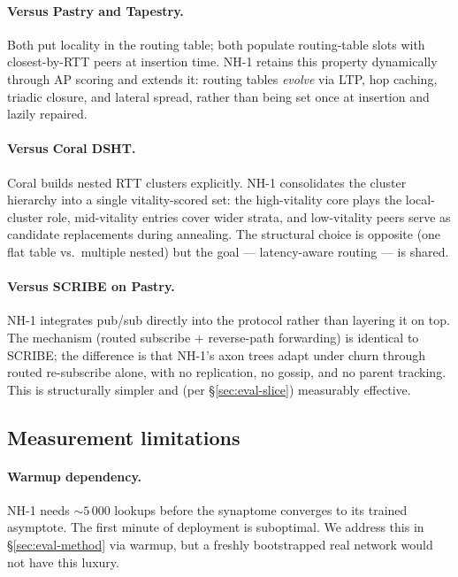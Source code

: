 \documentclass[conference]{IEEEtran}
\newcommand{\nhone}{NH-1\xspace}
\begin{document}
\paragraph{Versus Pastry and Tapestry.} Both put locality in the
routing table; both populate routing-table slots with closest-by-RTT
peers at insertion time. \nhone retains this property dynamically
through AP scoring and extends it: routing tables \emph{evolve} via
LTP, hop caching, triadic closure, and lateral spread, rather than
being set once at insertion and lazily repaired.

\paragraph{Versus Coral DSHT.} Coral builds nested RTT clusters
explicitly. \nhone consolidates the cluster hierarchy into a single
vitality-scored set: the high-vitality core plays the local-cluster
role, mid-vitality entries cover wider strata, and low-vitality peers
serve as candidate replacements during annealing. The structural
choice is opposite (one flat table vs.\ multiple nested) but the goal
--- latency-aware routing --- is shared.

\paragraph{Versus SCRIBE on Pastry.} \nhone integrates pub/sub directly
into the protocol rather than layering it on top. The mechanism
(routed subscribe + reverse-path forwarding) is identical to SCRIBE; the
difference is that \nhone's axon trees adapt under churn through routed
re-subscribe alone, with no replication, no gossip, and no parent
tracking. This is structurally simpler and (per
\S\ref{sec:eval-slice}) measurably effective.

\subsection{Measurement limitations}

\paragraph{Warmup dependency.} \nhone needs $\sim\!5\,000$ lookups
before the synaptome converges to its trained asymptote. The first
minute of deployment is suboptimal. We address this in
\S\ref{sec:eval-method} via warmup, but a freshly bootstrapped real
network would not have this luxury.
\end{document}
